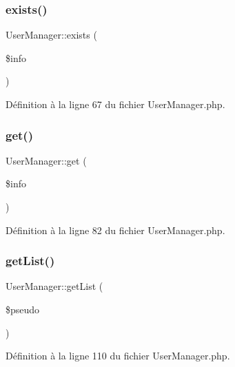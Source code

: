 \subsubsection{\texorpdfstring{exists()}{exists()}}
{\footnotesize\ttfamily User\+Manager\+::exists (\begin{DoxyParamCaption}\item[{}]{\$info }\end{DoxyParamCaption})}



Définition à la ligne 67 du fichier User\+Manager.\+php.

\mbox{\label{class_user_manager_abbd033634c759ebe6a16a98e27697f31}} 
\subsubsection{\texorpdfstring{get()}{get()}}
{\footnotesize\ttfamily User\+Manager\+::get (\begin{DoxyParamCaption}\item[{}]{\$info }\end{DoxyParamCaption})}



Définition à la ligne 82 du fichier User\+Manager.\+php.

\mbox{\label{class_user_manager_ae5ecbbf0eaf09bf9f8b05208a5e858f4}} 
\subsubsection{\texorpdfstring{get\+List()}{getList()}}
{\footnotesize\ttfamily User\+Manager\+::get\+List (\begin{DoxyParamCaption}\item[{}]{\$pseudo }\end{DoxyParamCaption})}



Définition à la ligne 110 du fichier User\+Manager.\+php.

\mbox{\label{class_user_manager_a08370d99527bfd6b2fae2923a7c21acb}} 
